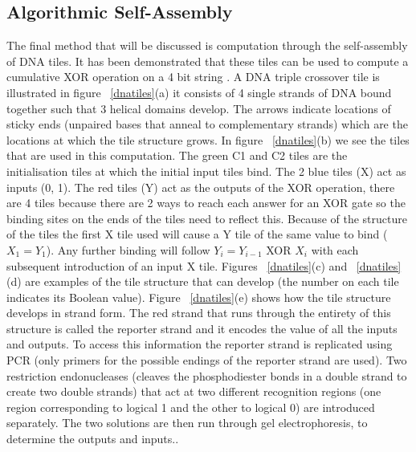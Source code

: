 \documentclass[11pt,a4paper,portrait]{article}
\begin{document}
\subsection{Algorithmic Self-Assembly}
The final method that will be discussed is computation through the self-assembly of DNA tiles. It has been demonstrated that these tiles can be used to compute a cumulative XOR operation on a 4 bit string \cite{Tiles00}. A DNA triple crossover tile is illustrated in figure ~\ref{dnatiles}(a) it consists of 4 single strands of DNA bound together such that 3 helical domains develop. The arrows indicate locations of sticky ends (unpaired bases that anneal to complementary strands) which are the locations at which the tile structure grows. In figure ~\ref{dnatiles}(b) we see the tiles that are used in this computation. The green C1 and C2 tiles are the initialisation tiles at which the initial input tiles bind. The 2 blue tiles (X) act as inputs (0, 1). The red tiles (Y) act as the outputs of the XOR operation, there are 4 tiles because there are 2 ways to reach each answer for an XOR gate so the binding sites on the ends of the tiles need to reflect this. Because of the structure of the tiles the first X tile used will cause a Y tile of the same value to bind ($X_1=Y_1$). Any further binding will follow $Y_i=Y_{i-1}$ XOR $X_i$ with each subsequent introduction of an input X tile. Figures ~\ref{dnatiles}(c) and ~\ref{dnatiles}(d) are examples of the tile structure that can develop (the number on each tile indicates its Boolean value). Figure ~\ref{dnatiles}(e) shows how the tile structure develops in strand form. The red strand that runs through the entirety of this structure is called the reporter strand and it encodes the value of all the inputs and outputs. To access this information the reporter strand is replicated using PCR (only primers for the possible endings of the reporter strand are used). Two restriction endonucleases (cleaves the phosphodiester bonds in a double strand to create two double strands\cite{paun2013DNA}) that act at two different recognition regions (one region corresponding to logical 1 and the other to logical 0) are introduced separately. The two solutions are then run through gel electrophoresis, to determine the outputs and inputs.\cite{Tiles00}.
\end{document}
